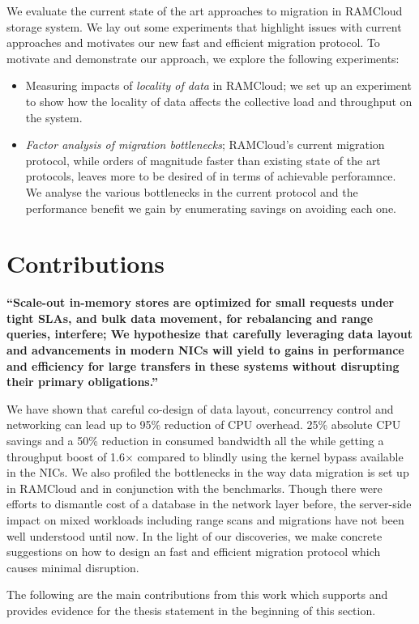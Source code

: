We evaluate the current state of the art approaches to migration in RAMCloud storage system.
We lay out some experiments that highlight issues with current approaches and motivates our new 
fast and efficient migration protocol. To motivate and demonstrate our approach, we explore
the following experiments:
\begin{itemize}
\item Measuring impacts of {\em locality of data} in RAMCloud; we set up an experiment to show how 
the locality of data affects the collective load and throughput on the system.
\item {\em Factor analysis of migration bottlenecks}; RAMCloud's current migration protocol, while orders 
of magnitude faster than existing state of the art protocols, leaves more to be desired of in terms of achievable perforamnce.
We analyse the various bottlenecks in the current protocol and the performance benefit we gain by enumerating savings on avoiding 
each one.
\end{itemize} 

\section{Contributions}

\textbf{\enquote{Scale-out in-memory stores are optimized for small requests
under tight SLAs, and bulk data movement, for rebalancing and range queries, interfere;
We hypothesize that carefully leveraging data layout and advancements in modern NICs
will yield to gains in performance and efficiency for large transfers in these systems
without disrupting their primary obligations.}}
 
We have shown that careful co-design of data layout, concurrency control
and networking can lead up to 95\% reduction of CPU overhead. 25\% absolute CPU savings and a 
50\% reduction in consumed bandwidth all the while getting a throughput
boost of 1.6$\times$ compared to blindly using the kernel bypass available
in the NICs. We also profiled the bottlenecks in the way data migration is set up
in RAMCloud and in conjunction with the benchmarks. Though there were efforts to 
dismantle cost of a database in the network layer before, the server-side impact
on mixed workloads including range scans and migrations have not been well understood
until now. In the light of our discoveries, we make concrete suggestions on how
 to design an fast and efficient migration protocol which causes minimal disruption.

The following are the main contributions from this work which supports and provides
evidence for the thesis statement in the beginning of this section.


